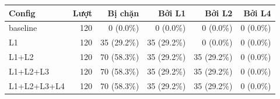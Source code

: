 \begin{tabular}{lrrrrr}
\toprule
Config & Lượt & Bị chặn & Bởi L1 & Bởi L2 & Bởi L4 \\
\midrule
baseline & 120 & 0 (0.0\%) & 0 (0.0\%) & 0 (0.0\%) & 0 (0.0\%) \\
L1 & 120 & 35 (29.2\%) & 35 (29.2\%) & 0 (0.0\%) & 0 (0.0\%) \\
L1+L2 & 120 & 70 (58.3\%) & 35 (29.2\%) & 35 (29.2\%) & 0 (0.0\%) \\
L1+L2+L3 & 120 & 70 (58.3\%) & 35 (29.2\%) & 35 (29.2\%) & 0 (0.0\%) \\
L1+L2+L3+L4 & 120 & 70 (58.3\%) & 35 (29.2\%) & 35 (29.2\%) & 0 (0.0\%) \\
\bottomrule
\end{tabular}
